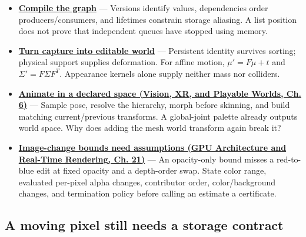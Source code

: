 \begin{itemize}
\item
  \textbf{\hyperref[06-engine-ii-ch042-compile-a-render-graph-before-executing-it]{Compile the graph}} --- Versions identify values, dependencies order producers/consumers, and lifetimes constrain storage aliasing. A list position does not prove that independent queues have stopped using memory.
\item
  \textbf{\hyperref[06-engine-ii-ch042-rendering-identity-becomes-world-identity-only-through-an-explicit-bridge]{Turn capture into editable world}} --- Persistent identity survives sorting; physical support supplies deformation. For affine motion, \(\mu'=F\mu+t\) and \(\Sigma'=F\Sigma F^T\). Appearance kernels alone supply neither mass nor colliders.
\item
  \textbf{\href{../07-Vision-XR-and-Playable-Worlds/main.pdf\#nameddest=04-visual-computing-ii-ch037-build-a-pose-first-then-deform-the-surface}{Animate in a declared space (Vision, XR, and Playable Worlds, Ch. 6)}} --- Sample pose, resolve the hierarchy, morph before skinning, and build matching current/previous transforms. A global-joint palette already outputs world space. Why does adding the mesh world transform again break it?
\item
  \textbf{\href{../06-GPU-Architecture-and-Real-Time-Rendering/main.pdf\#nameddest=06-engine-ii-ch045-an-image-change-certificate-must-name-the-edits-it-covers}{Image-change bounds need assumptions (GPU Architecture and Real-Time Rendering, Ch. 21)}} --- An opacity-only bound misses a red-to-blue edit at fixed opacity and a depth-order swap. State color range, evaluated per-pixel alpha changes, contributor order, color/background changes, and termination policy before calling an estimate a certificate.
\end{itemize}

\subsection{A moving pixel still needs a storage contract}\label{appendix-a8f634b076b5-a-moving-pixel-still-needs-a-storage-contract}

